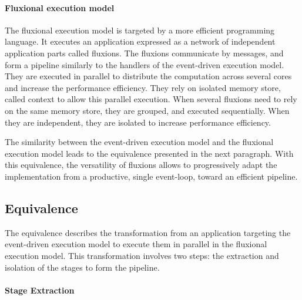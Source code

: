\begin{figure}
  \centering
\end{figure}

\paragraph{Fluxional execution model}

The fluxional execution model is targeted by a more efficient programming language.
It executes an application expressed as a network of independent application parts called fluxions.
The fluxions communicate by messages, and form a pipeline similarly to the handlers of the event-driven execution model.
They are executed in parallel to distribute the computation across several cores and increase the performance efficiency.
They rely on isolated memory store, called context to allow this parallel execution.
When several fluxions need to rely on the same memory store, they are grouped, and executed sequentially.
When they are independent, they are isolated to increase performance efficiency.

The similarity between the event-driven execution model and the fluxional execution model leads to the equivalence presented in the next paragraph.
With this equivalence, the versatility of fluxions allows to progressively adapt the implementation from a productive, single event-loop, toward an efficient pipeline.

\subsection{Equivalence}

The equivalence describes the transformation from an application targeting the event-driven execution model to execute them in parallel in the fluxional execution model.
This transformation involves two steps: the extraction and isolation of the stages to form the pipeline.

\paragraph{Stage Extraction} \label{chapter7:summary:extraction}

